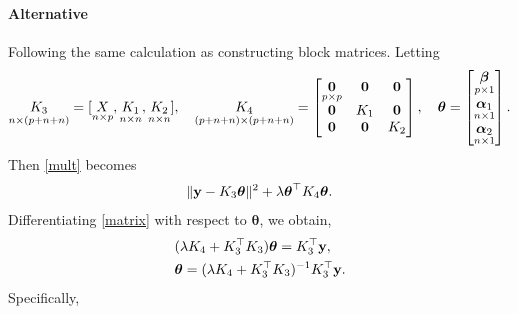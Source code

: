 \documentclass[11pt]{report}
\def\by{{\bf y}}
\def\bzero{{\bf 0}}
\def\bbeta{{\boldsymbol \beta}}
\def\balpha{{\boldsymbol \alpha}}
\def\btheta{{\boldsymbol \theta}}
\begin{document}
\paragraph{Alternative}
Following the same calculation as constructing block matrices. Letting
\begin{align*}
\underset{n\times (p+n+n)}{K_3}=[\underset{n\times p}{X}, \underset{n\times n}{K_1}, \underset{n\times n}{K_2}], \quad
\underset{(p+n+n) \times (p+n+n)}{K_4}=\begin{bmatrix}
\underset{p\times p}{\bzero} & \bzero &\bzero \\ 
\bzero & K_1 & \bzero\\ 
\bzero & \bzero & K_2
\end{bmatrix}, \quad
\btheta=\begin{bmatrix}
\underset{p\times 1}{\bbeta} \\ 
\underset{n\times 1}{\balpha_1} \\ 
\underset{n\times 1}{\balpha_2}
\end{bmatrix}.
\end{align*}
Then \eqref{mult} becomes
\begin{align}
\lVert \by-K_3 \btheta \rVert^2 + \lambda \btheta^\top K_4 \btheta. \label{matrix}
\end{align}
Differentiating \eqref{matrix} with respect to $\btheta$, we obtain, 
\begin{align*}
&(\lambda K_4+K_3^\top K_3)\btheta = K_3^\top \by,\\
&\btheta = (\lambda K_4+K_3^\top K_3)^{-1}K_3^\top \by.
\end{align*}
Specifically,
\end{document}
